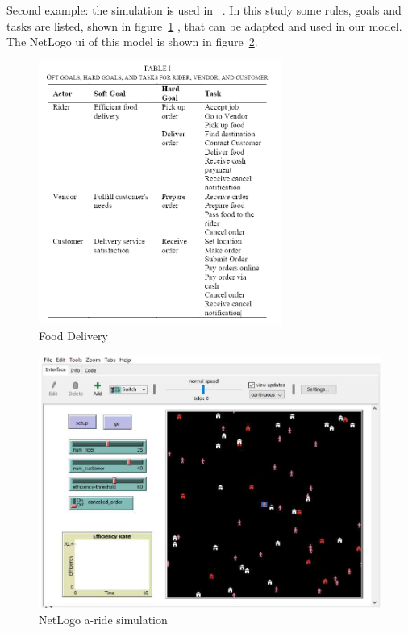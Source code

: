 Second example: the simulation is used in ~\cite{ismail2024software}.
In this study some rules, goals and tasks are listed, shown in figure~\ref{fig:tasktable} , that can be adapted and used in our model.
The NetLogo ui of this model is shown in figure~\ref{fig:a-ride}.
\begin{figure}
    \centering
    \includegraphics[width=8cm]{sections/pics/TaskTabel}
    \caption{Food Delivery}
    \label{fig:tasktable}
\end{figure}

\begin{figure}
    \centering
    \includegraphics[width=\linewidth]{sections/pics/a-ride}
    \caption{NetLogo a-ride simulation}
    \label{fig:a-ride}
\end{figure}
